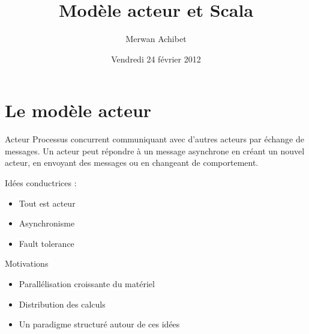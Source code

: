 \documentclass{beamer}
\title{Modèle acteur et Scala}
\author{Merwan Achibet}
\institute{Université du Havre}
\date{Vendredi 24 février 2012}
\begin{document}
\maketitle

\section{Le modèle acteur}

\begin{frame}

  \begin{block}{Acteur}
    Processus concurrent communiquant avec d'autres acteurs par
    échange de messages. Un acteur peut répondre à un message
    asynchrone en créant un nouvel acteur, en envoyant des messages ou
    en changeant de comportement. \cite{haller}
  \end{block}

  \vfill

  Idées conductrices :

  \begin{itemize}
  \item{Tout est acteur}
  \item{Asynchronisme}
  \item{Fault tolerance}
  \end{itemize}

\end{frame}

\begin{frame}

  \begin{block}{Motivations}
    \begin{itemize}
    \item{Parallélisation croissante du matériel}
    \item{Distribution des calculs}
    \item{Un paradigme structuré autour de ces idées}
    \end{itemize}
  \end{block}

  \vfill

  \begin{figure}

    \centering


    \end{figure}

\end{frame}
\end{document}
